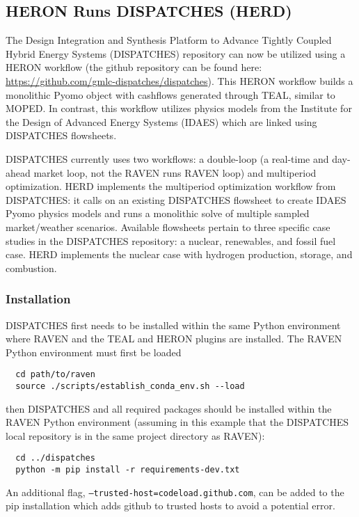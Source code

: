 \subsection{HERON Runs DISPATCHES (HERD)}
The Design Integration and Synthesis Platform to Advance Tightly Coupled Hybrid Energy Systems (DISPATCHES) repository can now be utilized using a HERON workflow (the github repository can be found here: \url{https://github.com/gmlc-dispatches/dispatches}). This HERON workflow builds a monolithic Pyomo object with cashflows generated through TEAL, similar to MOPED. In contrast, this workflow utilizes physics models from the Institute for the Design of Advanced Energy Systems (IDAES) which are linked using DISPATCHES flowsheets. 

DISPATCHES currently uses two workflows: a double-loop (a real-time and day-ahead market loop, not the RAVEN runs RAVEN loop) and multiperiod optimization.  HERD implements the multiperiod optimization workflow from DISPATCHES: it calls on an existing DISPATCHES flowsheet to create IDAES Pyomo physics models and runs a monolithic solve of multiple sampled market/weather scenarios. Available flowsheets pertain to three specific case studies in the DISPATCHES repository: a nuclear, renewables, and fossil fuel case. HERD implements the nuclear case with hydrogen production, storage, and combustion. 

\subsubsection{Installation}
DISPATCHES first needs to be installed within the same Python environment where RAVEN and the TEAL and HERON plugins are installed. The RAVEN Python environment must first be loaded
\begin{lstlisting}
  cd path/to/raven
  source ./scripts/establish_conda_env.sh --load
\end{lstlisting}
then DISPATCHES and all required packages should be installed within the RAVEN Python environment (assuming in this example that the DISPATCHES local repository is in the same project directory as RAVEN):
\begin{lstlisting}
  cd ../dispatches 
  python -m pip install -r requirements-dev.txt 
\end{lstlisting}
An additional flag, \texttt{--trusted-host=codeload.github.com}, can be added to the pip installation which adds github to trusted hosts to avoid a potential error. 

